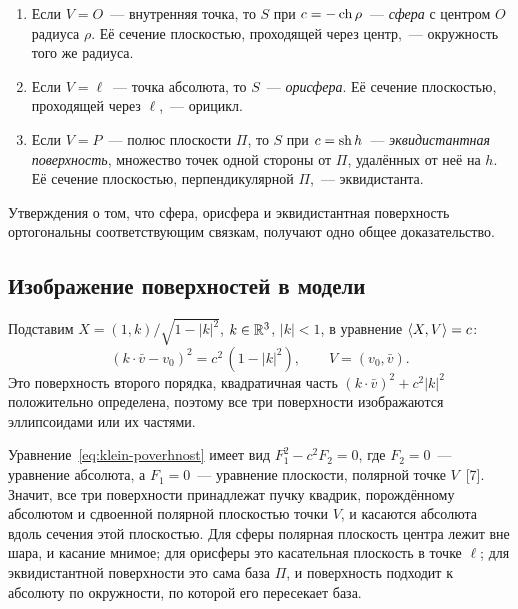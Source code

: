 \begin{corollary}\label{cor:poverhnosti}
\begin{enumerate}
  \item Если $V=O$~--- внутренняя точка, то $S$ при $c=-\operatorname{ch}\rho$~--- \emph{сфера} с центром $O$ радиуса $\rho$. Её сечение плоскостью, проходящей через центр,~--- окружность того же радиуса.
  \item Если $V=\ell$~--- точка абсолюта, то $S$~--- \emph{орисфера}. Её сечение плоскостью, проходящей через $\ell$,~--- орицикл.
  \item Если $V=P$~--- полюс плоскости $\Pi$, то $S$ при $c=\operatorname{sh} h$~--- \emph{эквидистантная поверхность}, множество точек одной стороны от $\Pi$, удалённых от неё на $h$. Её сечение плоскостью, перпендикулярной $\Pi$,~--- эквидистанта.
\end{enumerate}
\end{corollary}

Утверждения о том, что сфера, орисфера и эквидистантная поверхность ортогональны соответствующим связкам, получают одно общее доказательство.

\subsection{Изображение поверхностей в модели}

Подставим $X=(1,k)/\sqrt{1-|k|^2}$, $k\in\mathbb{R}^3$, $|k|<1$, в уравнение $\langle X,V\rangle=c$:
\begin{equation}\label{eq:klein-poverhnost}
(k\cdot\bar v-v_0)^2=c^2\,(1-|k|^2),\qquad V=(v_0,\bar v).
\end{equation}
Это поверхность второго порядка, квадратичная часть $(k\cdot\bar v)^2+c^2|k|^2$ положительно определена, поэтому все три поверхности изображаются эллипсоидами или их частями.

\begin{remark}
Уравнение~\eqref{eq:klein-poverhnost} имеет вид $F_1^2-c^2F_2=0$, где $F_2=0$~--- уравнение абсолюта, а $F_1=0$~--- уравнение плоскости, полярной точке $V$~[7]. Значит, все три поверхности принадлежат пучку квадрик, порождённому абсолютом и сдвоенной полярной плоскостью точки $V$, и касаются абсолюта вдоль сечения этой плоскостью. Для сферы полярная плоскость центра лежит вне шара, и касание мнимое; для орисферы это касательная плоскость в точке $\ell$; для эквидистантной поверхности это сама база $\Pi$, и поверхность подходит к абсолюту по окружности, по которой его пересекает база.
\end{remark}

